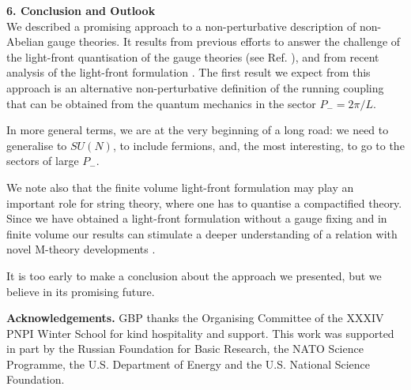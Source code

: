 \documentclass[a4paper,12pt]{article}
\begin{document}
{\bf 6. Conclusion and Outlook}\\

We described a promising approach to a non-perturbative
description of non-Abelian gauge theories. 
It results from previous efforts to answer the challenge 
of the light-front quantisation of the gauge theories 
(see Ref. \cite{Brodsky}), and from recent 
analysis of the light-front formulation \cite{KMPV}. 
The first result we expect 
from this approach is an alternative non-perturbative 
definition of the running coupling that can be obtained from the 
quantum mechanics in the sector $P_-=2\pi/L$.

In more general terms, we are at 
the very beginning of a long road: 
we need to generalise  to $SU(N)$, to include fermions, and, 
the most interesting, to go to the sectors of large $P_-$. 

We note also that the finite volume light-front formulation 
may play an important role for string theory,
where one has to quantise  a compactified theory.
Since we have obtained a light-front formulation 
without a gauge fixing 
and in finite volume our results can stimulate 
a deeper understanding 
of a relation with novel
M-theory developments \cite{Susskind}.

It is too early to make a conclusion about the 
approach we presented, but we believe in its 
promising future.



{\bf Acknowledgements.}
GBP thanks the Organising Committee of the XXXIV PNPI Winter School
for kind hospitality and support. 
This work was supported  in part
by the Russian Foundation 
for Basic Research,  the NATO Science Programme,
the U.S. Department of Energy and the U.S. National Science Foundation.
\end{document}
